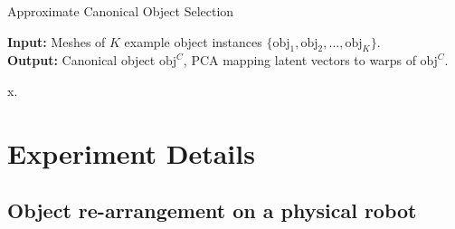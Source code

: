 \documentclass{article}
\begin{document}
\begin{algorithm}[H]

\caption{Approximate Canonical Object Selection}\label{alg:canon_select_2} 

\begin{flushleft}
    \hspace*{\algorithmicindent} \textbf{Input:} Meshes of $K$ example object instances $\{ \mathrm{obj}_1, \mathrm{obj}_2, ..., \mathrm{obj}_K \}$. \\
    \hspace*{\algorithmicindent} \textbf{Output:} Canonical object $\mathrm{obj}^C$, $\mathrm{PCA}$ mapping latent vectors to warps of $\mathrm{obj}^C$. \\
\end{flushleft}

\begin{algorithmic}[1]

    \State x.

\end{algorithmic}

\end{algorithm}

\section{Experiment Details}
\label{appendix:experiment}

\subsection{Object re-arrangement on a physical robot}
\label{appendix:experiment:rearrangement}
\end{document}
